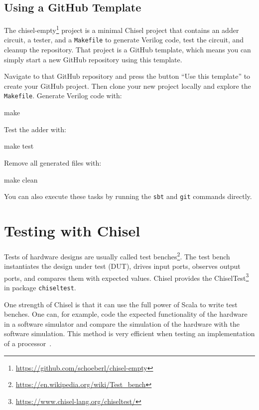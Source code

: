 \documentclass[%
    10pt,
    headinclude, footexclude,
    openright, %
    notitlepage,
    cleardoubleempty,
    headsepline,
    pointlessnumbers,
    bibtotoc, idxtotoc,
    ]{scrbook}
\newcommand{\code}[1]{{\lstinline[basicstyle=\small\ttfamily]{#1}}}
\newcommand{\myref}[2]{\href{#1}{#2}}
\renewcommand{\myref}[2]{{#2}{\footnote{\url{#1}}}}
\begin{document}

\subsection{Using a GitHub Template}

The \myref{https://github.com/schoeberl/chisel-empty}{chisel-empty} project is a minimal Chisel
project that contains an adder circuit, a tester, and a \code{Makefile} to generate
Verilog code, test the circuit, and cleanup the repository.
That project is a GitHub template, which means you can simply start a new GitHub repository
using this template.

Navigate to that GitHub repository and press the button ``Use this template'' to create
your GitHub project. Then clone your new project locally and explore the \code{Makefile}.
Generate Verilog code with:

\begin{chisel}
make
\end{chisel}

\noindent Test the adder with:

\begin{chisel}
make test
\end{chisel}

\noindent Remove all generated files with:

\begin{chisel}
make clean
\end{chisel}

\noindent You can also execute these tasks by running the \code{sbt} and \code{git} commands directly.

\section{Testing with Chisel}

Tests of hardware designs are usually called \myref{https://en.wikipedia.org/wiki/Test_bench}{test benches}.
The test bench instantiates the design under test (DUT), drives input ports, observes output ports,
and compares them with expected values.
Chisel provides the \myref{https://www.chisel-lang.org/chiseltest/}{ChiselTest}
in package \code{chiseltest}.

One strength of Chisel is that it can use the full power of Scala to write
test benches. One can, for example, code the expected functionality of the hardware
in a software simulator and compare the simulation of the hardware with the
software simulation. This method is very efficient when testing an implementation
of a processor~\cite{lipsi:arcs2018}.
\end{document}
